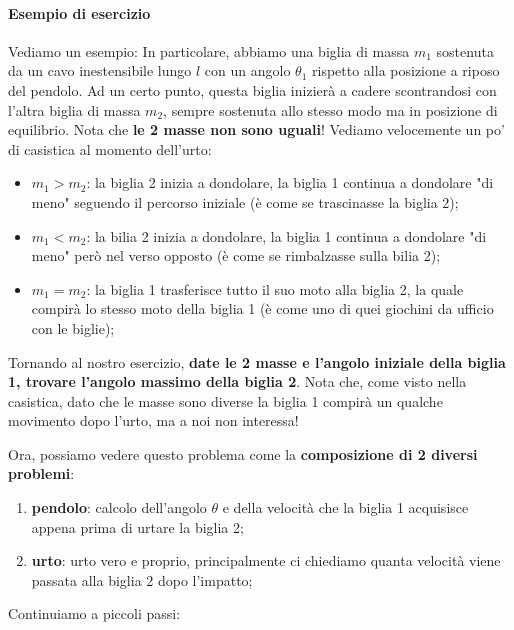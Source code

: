             \paragraph{Esempio di esercizio}
                Vediamo un esempio:
                In particolare, abbiamo una biglia di massa $m_1$ sostenuta da un cavo inestensibile lungo $l$ con un angolo $\theta_1$ rispetto alla posizione a riposo del pendolo. Ad un certo punto, questa biglia inizierà a cadere scontrandosi con l'altra biglia di massa $m_2$, sempre sostenuta allo stesso modo ma in posizione di equilibrio. Nota che \textbf{le 2 masse non sono uguali}! Vediamo velocemente un po' di casistica al momento dell'urto:
                \begin{itemize}
                    \item $m_1>m_2$: la biglia 2 inizia a dondolare, la biglia 1 continua a dondolare "di meno" seguendo il percorso iniziale (è come se trascinasse la biglia 2);
                    \item $m_1<m_2$: la bilia 2 inizia a dondolare, la biglia 1 continua a dondolare "di meno" però nel verso opposto (è come se rimbalzasse sulla bilia 2);
                    \item $m_1=m_2$: la biglia 1 trasferisce tutto il suo moto alla biglia 2, la quale compirà lo stesso moto della biglia 1 (è come uno di quei giochini da ufficio con le biglie);
                \end{itemize}
                Tornando al nostro esercizio, \textbf{date le 2 masse e l'angolo iniziale della biglia 1, trovare l'angolo massimo della biglia 2}. Nota che, come visto nella casistica, dato che le masse sono diverse la biglia 1 compirà un qualche movimento dopo l'urto, ma a noi non interessa!

                Ora, possiamo vedere questo problema come la \textbf{composizione di 2 diversi problemi}:
                \begin{enumerate}
                    \item \textbf{pendolo}: calcolo dell'angolo $\theta$ e della velocità che la biglia 1 acquisisce appena prima di urtare la biglia 2;
                    \item \textbf{urto}: urto vero e proprio, principalmente ci chiediamo quanta velocità viene passata alla biglia 2 dopo l'impatto;
                \end{enumerate}

                Continuiamo a piccoli passi:

